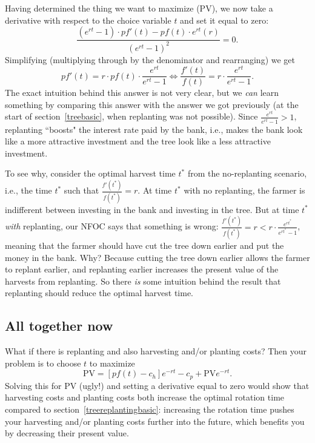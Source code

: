 Having determined the thing we want to maximize (PV), we now take a derivative with respect to the choice variable $t$ and set it equal to zero:
\[
\frac{(e^{rt}-1)\cdot pf'(t) - pf(t)\cdot e^{rt}(r)}{(e^{rt}-1)^2}
= 0.
\]
Simplifying (multiplying through by the denominator and rearranging) we get
\[
pf'(t)=r\cdot pf(t)\cdot \frac{e^{rt}}{e^{rt}-1}
\Longleftrightarrow \frac{f'(t)}{f(t)}=r\cdot
\frac{e^{rt}}{e^{rt}-1}.
\]
%
The exact intuition behind this answer is not very clear, but we \emph{can} learn something by comparing this answer with the answer we got previously (at the start of section~\ref{treebasic}, when replanting was not possible). Since $\displaystyle \frac{e^{rt}}{e^{rt}-1}>1$, replanting ``boosts" the interest rate paid by the bank, i.e., makes the bank look like a more attractive investment and the tree look like a less attractive investment.

To see why, consider the optimal harvest time $t^*$ from the no-replanting scenario, i.e., the time $t^*$ such that $\displaystyle \frac{f'(t^*)}{f(t^*)}=r$. At time $t^*$ with no replanting, the farmer is indifferent between investing in the bank and investing in the tree. But at time $t^*$ \emph{with} replanting, our NFOC says that something is wrong: $\displaystyle \frac{f'(t^*)}{f(t^*)}=r<r\cdot \frac{e^{rt^*}}{e^{rt^*}-1}$, meaning that the farmer should have cut the tree down earlier and put the money in the bank. Why? Because cutting the tree down earlier allows the farmer to replant earlier, and replanting earlier increases the present value of the harvests from replanting. So there \emph{is} some intuition behind the result that replanting should reduce the optimal harvest time.


\subsection*{All together now}

What if there is replanting and also harvesting and/or planting costs? Then your problem is to choose $t$ to maximize
\[
\mbox{PV}  = [pf(t)-c_h]e^{-rt} - c_p + \mbox{PV}e^{-rt}.
\]
Solving this for PV (ugly!) and setting a derivative equal to zero would show that harvesting costs and planting costs both increase the optimal rotation time compared to section~\ref{treereplantingbasic}: increasing the rotation time pushes your harvesting and/or planting costs further into the future, which benefits you by decreasing their present value.


